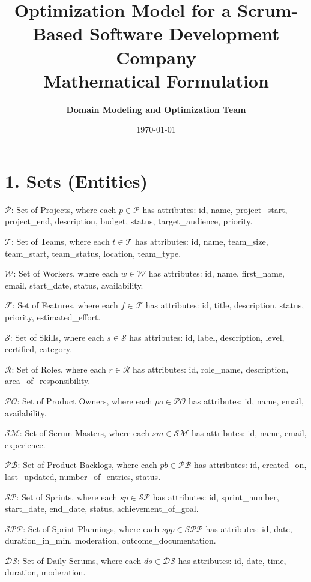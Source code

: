 \documentclass[12pt]{article}
\title{\Huge Optimization Model for a Scrum-Based Software Development Company \\ \vspace{0.5cm} \Large Mathematical Formulation}
\author{\textbf{Domain Modeling and Optimization Team}}
\date{\today}
\begin{document}
\maketitle
\tableofcontents
\newpage

\section{1. Sets (Entities)}
\item $\mathcal{P}$: Set of Projects, where each $p \in \mathcal{P}$ has attributes: id, name, project\_start, project\_end, description, budget, status, target\_audience, priority.
    \item $\mathcal{T}$: Set of Teams, where each $t \in \mathcal{T}$ has attributes: id, name, team\_size, team\_start, team\_status, location, team\_type.
    \item $\mathcal{W}$: Set of Workers, where each $w \in \mathcal{W}$ has attributes: id, name, first\_name, email, start\_date, status, availability.
    \item $\mathcal{F}$: Set of Features, where each $f \in \mathcal{F}$ has attributes: id, title, description, status, priority, estimated\_effort.
    \item $\mathcal{S}$: Set of Skills, where each $s \in \mathcal{S}$ has attributes: id, label, description, level, certified, category.
    \item $\mathcal{R}$: Set of Roles, where each $r \in \mathcal{R}$ has attributes: id, role\_name, description, area\_of\_responsibility.
    \item $\mathcal{PO}$: Set of Product Owners, where each $po \in \mathcal{PO}$ has attributes: id, name, email, availability.
    \item $\mathcal{SM}$: Set of Scrum Masters, where each $sm \in \mathcal{SM}$ has attributes: id, name, email, experience.
    \item $\mathcal{PB}$: Set of Product Backlogs, where each $pb \in \mathcal{PB}$ has attributes: id, created\_on, last\_updated, number\_of\_entries, status.
    \item $\mathcal{SP}$: Set of Sprints, where each $sp \in \mathcal{SP}$ has attributes: id, sprint\_number, start\_date, end\_date, status, achievement\_of\_goal.
    \item $\mathcal{SPP}$: Set of Sprint Plannings, where each $spp \in \mathcal{SPP}$ has attributes: id, date, duration\_in\_min, moderation, outcome\_documentation.
    \item $\mathcal{DS}$: Set of Daily Scrums, where each $ds \in \mathcal{DS}$ has attributes: id, date, time, duration, moderation.
\end{document}
